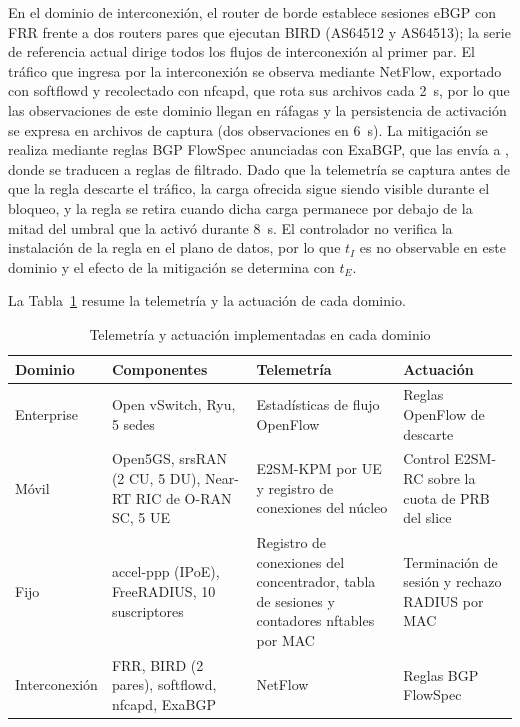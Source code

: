 En el dominio de interconexión, el router de borde  establece sesiones eBGP con FRR frente a dos routers pares que ejecutan BIRD (AS64512 y AS64513); la serie de referencia actual dirige todos los flujos de interconexión al primer par. El tráfico que ingresa por la interconexión se observa mediante NetFlow, exportado con softflowd y recolectado con nfcapd, que rota sus archivos cada 2~s, por lo que las observaciones de este dominio llegan en ráfagas y la persistencia de activación se expresa en archivos de captura (dos observaciones en 6~s). La mitigación se realiza mediante reglas BGP FlowSpec anunciadas con ExaBGP, que las envía a , donde se traducen a reglas de filtrado. Dado que la telemetría se captura antes de que la regla descarte el tráfico, la carga ofrecida sigue siendo visible durante el bloqueo, y la regla se retira cuando dicha carga permanece por debajo de la mitad del umbral que la activó durante 8~s. El controlador no verifica la instalación de la regla en el plano de datos, por lo que $t_I$ es no observable en este dominio y el efecto de la mitigación se determina con $t_E$.

La Tabla~\ref{tab:instrumentacion} resume la telemetría y la actuación de cada dominio.

\begin{table}[H]
    \begin{center}
        \renewcommand{\arraystretch}{1.5}
        \fontsize{10}{12}\selectfont
        \begin{tabular}{ >{\arraybackslash}m{2.3cm} >{\arraybackslash}m{3.8cm} >{\arraybackslash}m{3.8cm} >{\arraybackslash}m{3.8cm} }
        \hline
        \textbf{Dominio} & \textbf{Componentes} & \textbf{Telemetría} & \textbf{Actuación} \\ \hline
        Enterprise & Open vSwitch, Ryu, 5 sedes & Estadísticas de flujo OpenFlow & Reglas OpenFlow de descarte \\ \hline
        Móvil & Open5GS, srsRAN (2 CU, 5 DU), Near-RT RIC de O-RAN SC, 5 UE & E2SM-KPM por UE y registro de conexiones del núcleo & Control E2SM-RC sobre la cuota de PRB del slice \\ \hline
        Fijo & accel-ppp (IPoE), FreeRADIUS, 10 suscriptores & Registro de conexiones del concentrador, tabla de sesiones y contadores nftables por MAC & Terminación de sesión y rechazo RADIUS por MAC \\ \hline
        Interconexión & FRR, BIRD (2 pares), softflowd, nfcapd, ExaBGP & NetFlow & Reglas BGP FlowSpec \\ \hline
        \end{tabular}
        \caption{Telemetría y actuación implementadas en cada dominio}
        \label{tab:instrumentacion}
    \end{center}
\end{table}

